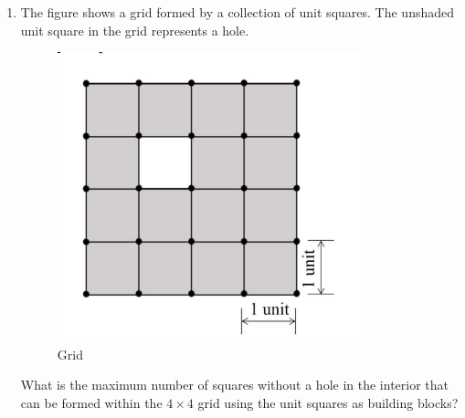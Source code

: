\documentclass[journal,12pt,onecolumn]{IEEEtran}
\theoremstyle{remark}
\begin{document}
\begin{enumerate}
\begin{enumerate}
\end{enumerate}
\item The figure shows a grid formed by a collection of unit squares. The unshaded unit square in the grid represents a hole.
\begin{figure}[H]
  \centering
  \includegraphics[width=0.4\columnwidth]{figs/grid.png}
  \caption{Grid}
  \label{fig:grid}
\end{figure}
What is the maximum number of squares without a hole in the interior that
can be formed within the $4 \times 4$ grid using the unit squares as building blocks?


\end{enumerate}
\end{document}
